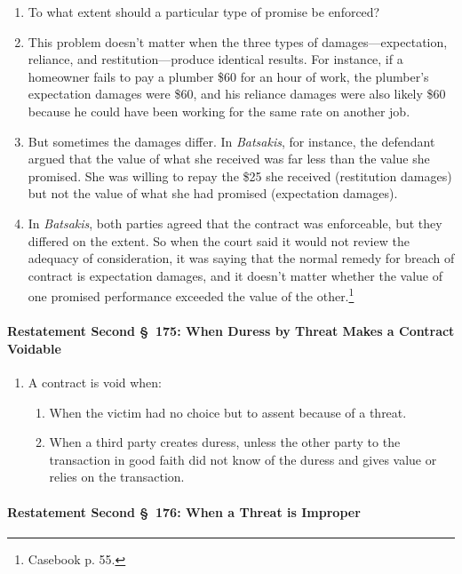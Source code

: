 \begin{enumerate}
    \item To what extent should a particular type of promise be enforced?
    \item This problem doesn't matter when the three types of 
    damages---expectation, reliance, and restitution---produce identical 
    results. For instance, if a homeowner fails to pay a plumber \$60 for an 
    hour of work, the plumber's expectation damages were \$60, and his 
    reliance damages were also likely \$60 because he could have been working 
    for the same rate on another job.
    \item But sometimes the damages differ. In \emph{Batsakis}, for instance, 
    the defendant argued that the value of what she received was far less than 
    the value she promised. She was willing to repay the \$25 she received 
    (restitution damages) but not the value of what she had promised 
    (expectation damages).
    \item In \emph{Batsakis}, both parties agreed that the contract was 
    enforceable, but they differed on the extent. So when the court said it 
    would not review the adequacy of consideration, it was saying that the 
    normal remedy for breach of contract is expectation damages, and it 
    doesn't matter whether the value of one promised performance exceeded the 
    value of the other.\footnote{Casebook p. 55.}
\end{enumerate}
 
\paragraph{Restatement Second \S\ 175: When Duress by Threat Makes a 
Contract Voidable}

\begin{enumerate}
    \item A contract is void when:
    \begin{enumerate}
        \item When the victim had no choice but to assent because of a threat.
        \item When a third party creates duress, unless the other party to the 
        transaction in good faith did not know of the duress and gives value 
        or relies on the transaction.
    \end{enumerate}
\end{enumerate}

\paragraph{Restatement Second \S\ 176: When a Threat is Improper}

